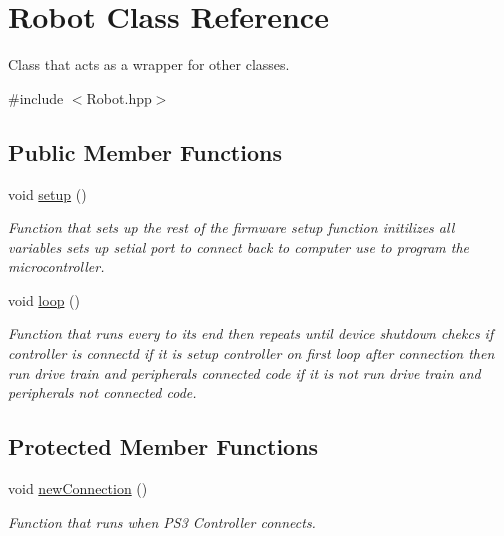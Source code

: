 \hypertarget{class_robot}{}\section{Robot Class Reference}
\label{class_robot}


Class that acts as a wrapper for other classes.  




{\ttfamily \#include $<$Robot.\+hpp$>$}

\subsection*{Public Member Functions}
\begin{DoxyCompactItemize}
\item 
\mbox{\label{class_robot_a1fc37e3c329d59795f6adf44199d4df9}} 
void \mbox{\hyperlink{class_robot_a1fc37e3c329d59795f6adf44199d4df9}{setup}} ()
\begin{DoxyCompactList}\small\item\em Function that sets up the rest of the firmware setup function initilizes all variables sets up setial port to connect back to computer use to program the microcontroller. \end{DoxyCompactList}\item 
void \mbox{\hyperlink{class_robot_ad92e1e27045a02533f55ecab2b16d368}{loop}} ()
\begin{DoxyCompactList}\small\item\em Function that runs every to its end then repeats until device shutdown chekcs if controller is connectd if it is setup controller on first loop after connection then run drive train and peripheral\textquotesingle{}s connected code if it is not run drive train and peripheral\textquotesingle{}s not connected code. \end{DoxyCompactList}\end{DoxyCompactItemize}
\subsection*{Protected Member Functions}
\begin{DoxyCompactItemize}
\item 
void \mbox{\hyperlink{class_robot_aca73cd3e3582f49cc0b33ee900cbc245}{new\+Connection}} ()
\begin{DoxyCompactList}\small\item\em Function that runs when P\+S3 Controller connects. \end{DoxyCompactList}\end{DoxyCompactItemize}
